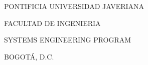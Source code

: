 \begin{titlepage}
    \centering
    \vspace*{3cm}

    {\Huge\bfseries \proyectoTitulo\par}

    \vspace{3cm}

    {\Large \autorUno\par}
    {\Large \autorDos\par}

    \vfill

    {\large PONTIFICIA UNIVERSIDAD JAVERIANA\par}
    {\large FACULTAD DE INGENIERIA\par}
    {\large SYSTEMS ENGINEERING PROGRAM\par}
    {\large BOGOTÁ, D.C.\par}
    {\large \anio\par}

\end{titlepage}
